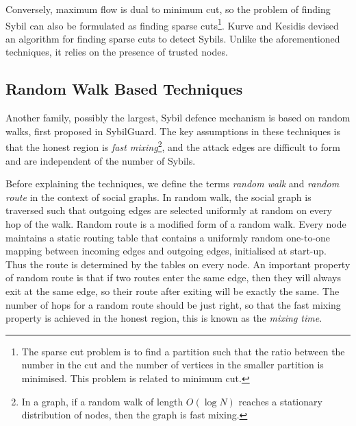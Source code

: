 Conversely, maximum flow is dual to minimum cut, so the problem of finding Sybil
can also be formulated as finding sparse cuts\footnote{The sparse cut problem is
  to find a partition such that the ratio between the number in the cut and the
  number of vertices in the smaller partition is minimised. This problem is
  related to minimum cut.}. Kurve and Kesidis devised an algorithm for finding
sparse cuts to detect Sybils\cite{kurve2011sybil}. Unlike the aforementioned
techniques, it relies on the presence of trusted nodes.

\subsection{Random Walk Based Techniques}\label{sec:random-walk}
Another family, possibly the largest, Sybil defence mechanism is based on random
walks, first proposed in SybilGuard\cite{yu2006sybilguard}. The key assumptions
in these techniques is that the honest region is \emph{fast mixing}\footnote{In
  a graph, if a random walk of length $O(\log{N})$ reaches a stationary
  distribution of nodes, then the graph is fast mixing.}, and the attack edges
are difficult to form and are independent of the number of Sybils.


Before explaining the techniques, we define the terms \emph{random walk} and
\emph{random route} in the context of social graphs. In random walk, the social
graph is traversed such that outgoing edges are selected uniformly at random on
every hop of the walk. Random route is a modified form of a random walk. Every
node maintains a static routing table that contains a uniformly random
one-to-one mapping between incoming edges and outgoing edges, initialised at
start-up. Thus the route is determined by the tables on every node. An important
property of random route is that if two routes enter the same edge, then they
will always exit at the same edge, so their route after exiting will be exactly
the same. The number of hops for a random route should be just right, so that
the fast mixing property is achieved in the honest region, this is known as the
\emph{mixing time}.

